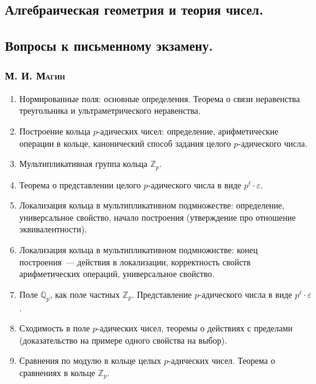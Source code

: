 \documentclass[12pt]{article}
\begin{document}
\begin{center}
    \section*{Алгебраическая геометрия и теория чисел.}
    \subsection*{Вопросы к письменному экзамену. }
    \subsubsection*{\textsc{М. И. Магин}}
\end{center}

\begin{enumerate}
    \item Нормированные поля: основные определения. Теорема о связи неравенства треугольника и ультраметрического неравенства.

    \item Построение кольца $p$-адических чисел: определение, арифметические операции в кольце, канонический способ задания целого $p$-адического числа.

    \item Мультипликативная группа кольца $\mathbb{Z}_p$.

    \item Теорема о представлении целого $p$-адического числа в виде $p^{\ell} \cdot \varepsilon$.

    \item Локализация кольца в мультипликативном подмножестве: определение, универсальное свойство, начало построения (утверждение про отношение эквивалентности).

    \item Локализация кольца в мультипликативном подмножнстве: конец построения~--- действия в локализации, корректность свойств арифметических операций, универсальное свойство.

    \item Поле $\mathbb{Q}_p$, как поле частных $\mathbb{Z}_p$. Представление $p$-адического числа в виде $p^{\ell} \cdot \varepsilon$.

    \item Сходимость в поле $p$-адических чисел, теоремы о действиях с пределами (доказательство на примере одного свойства на выбор).

    \item Сравнения по модулю в кольце целых  $p$-адических чисел. Теорема о сравнениях в кольце $\mathbb{Z}_p$.


\end{enumerate}
\end{document}
